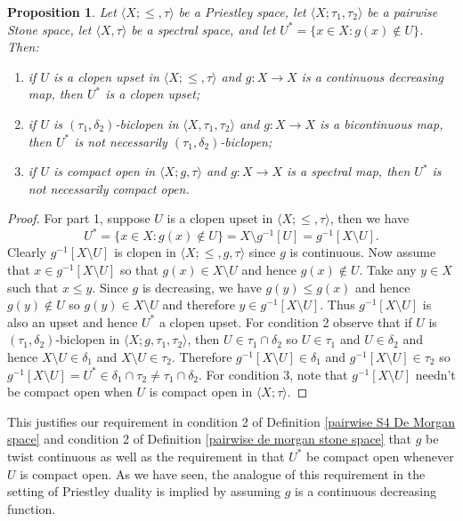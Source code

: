 \documentclass{amsart}
\theoremstyle{plain}
\newtheorem{proposition}[theorem]{Proposition}
\theoremstyle{definition}
\begin{document}
\begin{proposition}
    Let $\langle X;\leq,\tau\rangle$ be a Priestley space, let $\langle X;\tau_1,\tau_2\rangle$ be a pairwise Stone space, let $\langle X,\tau\rangle$ be a spectral space, and let $U^*=\{x\in X:g(x)\not\in U\}$. Then: 
    \begin{enumerate}
        \item if $U$ is a clopen upset in $\langle X;\leq,\tau\rangle$ and $g\colon X\to X$ is a continuous decreasing map, then $U^*$ is a clopen upset; 
        \item if $U$ is $(\tau_1,\delta_2)$-biclopen in $\langle X,\tau_1,\tau_2\rangle$ and $g\colon X\to X$ is a bicontinuous map, then $U^*$ is not necessarily $(\tau_1,\delta_2)$-biclopen; 
        \item if $U$ is compact open in $\langle X;g,\tau\rangle$ and $g\colon X\to X$ is a spectral map, then $U^*$ is not necessarily compact open. 
    \end{enumerate}
\end{proposition}
\begin{proof}
    For part 1, suppose $U$ is a clopen upset in $\langle X;\leq,\tau\rangle$, then we have 
    \[U^*=\{x\in X:g(x)\not\in U\}=X\setminus g^{-1}[U]=g^{-1}[X\setminus U].\] Clearly $g^{-1}[X\setminus U]$ is clopen in $\langle X;\leq,g,\tau\rangle$ since $g$ is continuous. Now assume that $x\in g^{-1}[X\setminus U]$ so that $g(x)\in X\setminus U$ and hence $g(x)\not\in U$. Take any $y\in X$ such that $x\leq y$. Since $g$ is decreasing, we have $g(y)\leq g(x)$ and hence $g(y)\not\in U$ so $g(y)\in X\setminus U$ and therefore $y\in g^{-1}[X\setminus U]$. Thus $g^{-1}[X\setminus U]$ is also an upset and hence $U^*$ a clopen upset. For condition 2 observe that if $U$ is $(\tau_1,\delta_2)$-biclopen in $\langle X;g,\tau_1,\tau_2\rangle$, then $U\in\tau_1\cap\delta_2$ so $U\in\tau_1$ and $U\in\delta_2$ and hence $X\setminus U\in\delta_1$ and $X\setminus U\in\tau_2$. Therefore $g^{-1}[X\setminus U]\in\delta_1$ and $g^{-1}[X\setminus U]\in\tau_2$ so $g^{-1}[X\setminus U]=U^*\in\delta_1\cap\tau_2\not=\tau_1\cap\delta_2$. For condition 3, note that $g^{-1}[X\setminus U]$ needn't be compact open when $U$ is compact open in $\langle X;\tau\rangle$.    
\end{proof}
This justifies our requirement in condition 2 of Definition \ref{pairwise S4 De Morgan space} and condition 2 of Definition \ref{pairwise de morgan stone space} that $g$ be twist continuous as well as the requirement in \cite{mcdonald} that $U^*$ be compact open whenever $U$ is compact open. As we have seen, the analogue of this requirement in the setting of Priestley duality is implied by assuming $g$ is a continuous decreasing function.    
\end{document}
